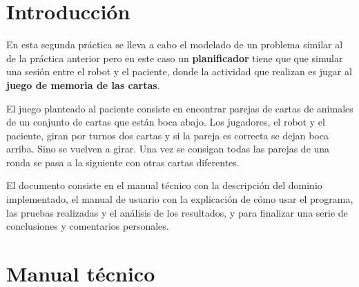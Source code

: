 \documentclass{uc3mpracticas}
\begin{document}
  \frontmatter



  \vspace{55mm}


  \newpage

  \tableofcontents

  \newpage

  \mainmatter

  \section{Introducción}

  En esta segunda práctica se lleva a cabo el modelado de un problema similar al de la práctica anterior pero en este caso un \textbf{planificador} tiene que que simular una sesión entre el robot y el paciente, donde la actividad que realizan es jugar al \textbf{juego de memoria de las cartas}.

  \vspace{2mm}

  El juego planteado al paciente consiste en encontrar parejas de cartas de animales de un conjunto de cartas que están boca abajo. Los jugadores, el robot y el paciente, giran por turnos dos cartas y si la pareja es correcta se dejan boca arriba. Sino se vuelven a girar. Una vez se consigan todas las parejas de una ronda se pasa a la siguiente con otras cartas diferentes.

  \vspace{3mm}

  El documento consiste en el manual técnico con la descripción del dominio implementado, el manual de usuario con la explicación de cómo usar el programa, las pruebas realizadas y el análisis de los resultados, y para finalizar una serie de conclusiones y comentarios personales.

  \vspace{5mm}

  \section{Manual técnico}
\end{document}
